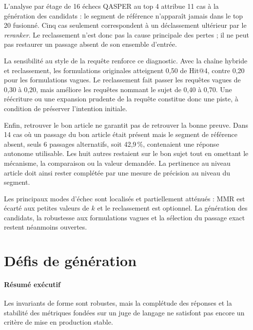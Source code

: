 L'analyse par étage de 16 échecs QASPER au top 4 attribue 11 cas à la génération
des candidats : le segment de référence n'apparaît jamais dans le top 20 fusionné.
Cinq cas seulement correspondent à un déclassement ultérieur par le
\emph{reranker}. Le reclassement n'est donc pas la cause principale des pertes ;
il ne peut pas restaurer un passage absent de son ensemble d'entrée.

La sensibilité au style de la requête renforce ce diagnostic. Avec la chaîne
hybride et reclassement, les formulations originales atteignent 0,50 de Hit@4,
contre 0,20 pour les formulations vagues. Le reclassement fait passer les
requêtes vagues de 0,30 à 0,20, mais améliore les requêtes nommant le sujet de
0,40 à 0,70. Une réécriture ou une expansion prudente de la requête constitue
donc une piste, à condition de préserver l'intention initiale.

Enfin, retrouver le bon article ne garantit pas de retrouver la bonne preuve.
Dans 14 cas où un passage du bon article était présent mais le segment de
référence absent, seuls 6 passages alternatifs, soit 42,9\,\%, contenaient une
réponse autonome utilisable. Les huit autres restaient sur le bon sujet tout en
omettant le mécanisme, la comparaison ou la valeur demandée. La pertinence au
niveau article doit ainsi rester complétée par une mesure de précision au niveau
du segment.

\begin{encadre}
Les principaux modes d'échec sont localisés et partiellement atténués : MMR est
écarté aux petites valeurs de \(k\) et le reclassement est optionnel. La génération
des candidats, la robustesse aux formulations vagues et la sélection du passage
exact restent néanmoins ouvertes.
\end{encadre}

\section{Défis de génération}

\paragraph{Résumé exécutif}

Les invariants de forme sont robustes, mais la complétude des réponses et la
stabilité des métriques fondées sur un juge de langage ne satisfont pas encore
un critère de mise en production stable.

